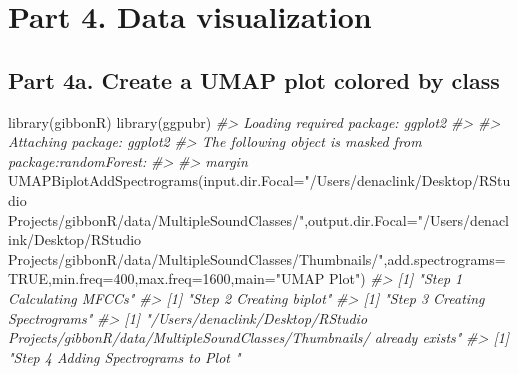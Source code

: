 \documentclass[
]{book}
\newenvironment{Shaded}{\begin{snugshade}}{\end{snugshade}}
\newcommand{\AttributeTok}[1]{\textcolor[rgb]{0.77,0.63,0.00}{#1}}
\newcommand{\CommentTok}[1]{\textcolor[rgb]{0.56,0.35,0.01}{\textit{#1}}}
\newcommand{\ConstantTok}[1]{\textcolor[rgb]{0.00,0.00,0.00}{#1}}
\newcommand{\DecValTok}[1]{\textcolor[rgb]{0.00,0.00,0.81}{#1}}
\newcommand{\FunctionTok}[1]{\textcolor[rgb]{0.00,0.00,0.00}{#1}}
\newcommand{\NormalTok}[1]{#1}
\newcommand{\StringTok}[1]{\textcolor[rgb]{0.31,0.60,0.02}{#1}}
\begin{document}
\hypertarget{part-4.-data-visualization}{%
\chapter{Part 4. Data visualization}\label{part-4.-data-visualization}}

\hypertarget{part-4a.-create-a-umap-plot-colored-by-class}{%
\section{Part 4a. Create a UMAP plot colored by class}\label{part-4a.-create-a-umap-plot-colored-by-class}}

\begin{Shaded}
\begin{Highlighting}[]
\FunctionTok{library}\NormalTok{(gibbonR)}
\FunctionTok{library}\NormalTok{(ggpubr)}
\CommentTok{\#\textgreater{} Loading required package: ggplot2}
\CommentTok{\#\textgreater{} }
\CommentTok{\#\textgreater{} Attaching package: \textquotesingle{}ggplot2\textquotesingle{}}
\CommentTok{\#\textgreater{} The following object is masked from \textquotesingle{}package:randomForest\textquotesingle{}:}
\CommentTok{\#\textgreater{} }
\CommentTok{\#\textgreater{}     margin}
\FunctionTok{UMAPBiplotAddSpectrograms}\NormalTok{(}\AttributeTok{input.dir.Focal=}\StringTok{"/Users/denaclink/Desktop/RStudio Projects/gibbonR/data/MultipleSoundClasses/"}\NormalTok{,}\AttributeTok{output.dir.Focal=}\StringTok{"/Users/denaclink/Desktop/RStudio Projects/gibbonR/data/MultipleSoundClasses/Thumbnails/"}\NormalTok{,}\AttributeTok{add.spectrograms=}\ConstantTok{TRUE}\NormalTok{,}\AttributeTok{min.freq=}\DecValTok{400}\NormalTok{,}\AttributeTok{max.freq=}\DecValTok{1600}\NormalTok{,}\AttributeTok{main=}\StringTok{"UMAP Plot"}\NormalTok{)}
\CommentTok{\#\textgreater{} [1] "Step 1 Calculating MFCCs"}
\CommentTok{\#\textgreater{} [1] "Step 2 Creating biplot"}
\CommentTok{\#\textgreater{} [1] "Step 3 Creating Spectrograms"}
\CommentTok{\#\textgreater{} [1] "/Users/denaclink/Desktop/RStudio Projects/gibbonR/data/MultipleSoundClasses/Thumbnails/ already exists"}
\CommentTok{\#\textgreater{} [1] "Step 4 Adding Spectrograms to Plot "}
\end{Highlighting}
\end{Shaded}
\end{document}
